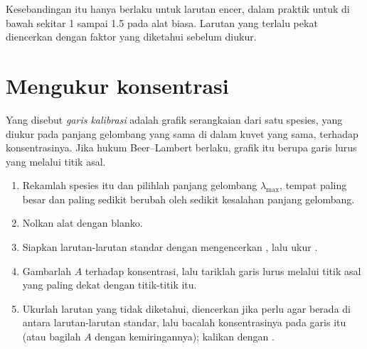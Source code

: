 \begin{remark}\label{rem:g11:absorbance:dilute}
Kesebandingan itu hanya berlaku untuk larutan encer, dalam praktik untuk
 di bawah sekitar 1 sampai 1.5 pada alat biasa. Larutan yang
terlalu pekat diencerkan dengan faktor yang diketahui sebelum diukur.
\end{remark}

\section{Mengukur konsentrasi}

\begin{definition}\label{def:g11:absorbance:calibration-line}
Yang disebut \emph{garis kalibrasi} adalah grafik
 serangkaian  dari satu spesies, yang diukur
pada panjang gelombang yang sama di dalam kuvet yang sama, terhadap
konsentrasinya. Jika hukum Beer--Lambert berlaku, grafik itu berupa
garis lurus yang melalui titik asal.
\end{definition}

\begin{method}\label{met:g11:absorbance:calibration}
\begin{enumerate}
  \item Rekamlah  spesies itu dan pilihlah panjang
        gelombang $\lambda_{\max}$, tempat  paling besar dan
        paling sedikit berubah oleh sedikit kesalahan panjang gelombang.
  \item Nolkan alat dengan blanko.
  \item Siapkan larutan-larutan standar dengan mengencerkan , lalu ukur .
  \item Gambarlah $A$ terhadap konsentrasi, lalu tariklah garis lurus
        melalui titik asal yang paling dekat dengan titik-titik itu.
  \item Ukurlah larutan yang tidak diketahui, diencerkan jika perlu agar
         berada di antara  larutan-larutan standar,
        lalu bacalah konsentrasinya pada garis itu (atau bagilah $A$
        dengan kemiringannya); kalikan dengan .
\end{enumerate}
\end{method}

